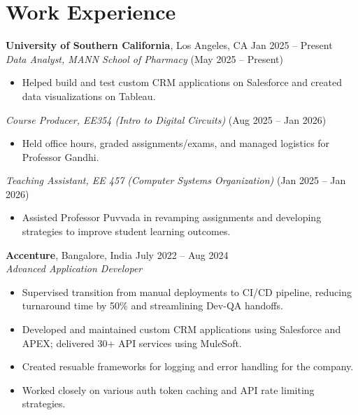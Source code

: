 \documentclass[letterpaper,10pt]{article}
\begin{document}
\section*{Work Experience}
    \textbf{University of Southern California}, Los Angeles, CA \hfill Jan 2025 -- Present \\
    \textit{Data Analyst, MANN School of Pharmacy} \hfill (May 2025 -- Present)
    \begin{itemize}[leftmargin=*]
        \item Helped build and test custom CRM applications on Salesforce and created data visualizations on Tableau.
    \end{itemize}
    
    \textit{Course Producer, EE354 (Intro to Digital Circuits)} \hfill (Aug 2025 -- Jan 2026)
    \begin{itemize}[leftmargin=*]
        \item Held office hours, graded assignments/exams, and managed logistics for Professor Gandhi.
    \end{itemize}
    
    \textit{Teaching Assistant, EE 457 (Computer Systems Organization)} \hfill (Jan 2025 -- Jan 2026)
    \begin{itemize}[leftmargin=*]
        \item Assisted Professor Puvvada in revamping assignments and developing strategies to improve student learning outcomes.
    \end{itemize}

    \vspace{2pt}
    \textbf{Accenture}, Bangalore, India \hfill July 2022 -- Aug 2024 \\
    \textit{Advanced Application Developer}
    \begin{itemize}[leftmargin=*]
        \item Supervised transition from manual deployments to CI/CD pipeline, reducing turnaround time by 50\% and streamlining Dev-QA handoffs.
        \item Developed and maintained custom CRM applications using Salesforce and APEX; delivered 30+ API services using MuleSoft.
        \item Created resuable frameworks for logging and error handling for the company.
        \item Worked closely on various auth token caching and API rate limiting strategies.
    \end{itemize}
\end{document}
